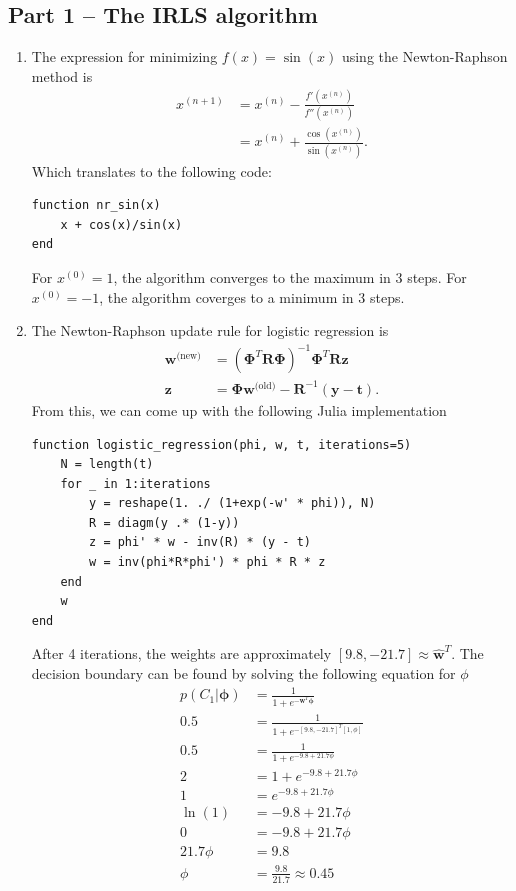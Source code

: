 \documentclass{article}
\begin{document}
\subsection*{Part 1 -- The IRLS algorithm}
\begin{enumerate}
\item
The expression for minimizing $f(x) = \sin(x)$ using the Newton-Raphson method is
\begin{align*}
x^{(n+1)}&=x^{(n)} - \frac{f'(x^{(n)})}{f''(x^{(n)})} \\
&=x^{(n)} + \frac{\cos(x^{(n)})}{\sin(x^{(n)})}.
\end{align*}
Which translates to the following code:
\begin{lstlisting}
function nr_sin(x)
    x + cos(x)/sin(x)
end
\end{lstlisting}
For $x^{(0)}=1$, the algorithm converges to the maximum in 3 steps. For $x^{(0)}=-1$, the algorithm coverges to a minimum in 3 steps.
\item The Newton-Raphson update rule for logistic regression is
\begin{align*}
\bm{w}^{\text{(new)}}&=(\bm{\Phi}^T\bm{R}\bm{\Phi})^{-1}\bm{\Phi}^T\bm{R}\textbf{z} \\
\textbf{z}&=\bm{\Phi}\bm{w}^{\text{(old)}}-\bm{R}^{-1}(\textbf{y} - \textbf{t}).
\end{align*}
From this, we can come up with the following Julia implementation
\begin{lstlisting}
function logistic_regression(phi, w, t, iterations=5)
    N = length(t)
    for _ in 1:iterations
        y = reshape(1. ./ (1+exp(-w' * phi)), N)
        R = diagm(y .* (1-y))
        z = phi' * w - inv(R) * (y - t)
        w = inv(phi*R*phi') * phi * R * z
    end
    w
end
\end{lstlisting}
After 4 iterations, the weights are approximately $[9.8, -21.7]\approx\hat{\bm{w}}^T$.
The decision boundary can be found by solving the following equation for $\phi$
\begin{align*}
p(C_1|\bm{\phi}) &= \frac{1}{1+e^{-\bm{w}^T\bm{\phi}}} \\
0.5 &=  \frac{1}{1+e^{-[9.8, -21.7]^T [1, \phi]}} \\
0.5 &=  \frac{1}{1+e^{-9.8 + 21.7\phi}} \\
2 &=  1+e^{-9.8 + 21.7\phi} \\
1 &=  e^{-9.8 + 21.7\phi} \\
\ln(1) &=  -9.8 + 21.7\phi \\
0 &=  -9.8 + 21.7\phi \\
21.7\phi &=  9.8 \\
\phi &= \frac{9.8}{21.7} \approx 0.45
\end{align*}
\end{enumerate}
\end{document}
